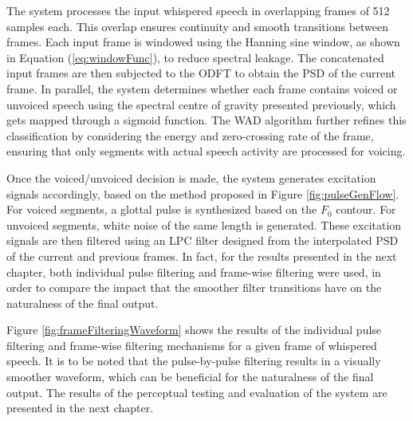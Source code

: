 The system processes the input whispered speech in overlapping frames of 512 samples each. This overlap ensures continuity and smooth transitions between frames. Each input frame is windowed using the Hanning sine window, as shown in Equation (\ref{eq:windowFunc}), to reduce spectral leakage. The concatenated input frames are then subjected to the ODFT to obtain the PSD of the current frame.  In parallel, the system determines whether each frame contains voiced or unvoiced speech using the spectral centre of gravity presented previously, which gets mapped through a sigmoid function. The WAD algorithm further refines this classification by considering the energy and zero-crossing rate of the frame, ensuring that only segments with actual speech activity are processed for voicing.

Once the voiced/unvoiced decision is made, the system generates excitation signals accordingly, based on the method proposed in Figure \ref{fig:pulseGenFlow}. For voiced segments, a glottal pulse is synthesized based on the $F_0$ contour. For unvoiced segments, white noise of the same length is generated.  These excitation signals are then filtered using an LPC filter designed from the interpolated PSD of the current and previous frames. In fact, for the results presented in the next chapter, both individual pulse filtering and frame-wise filtering were used, in order to compare the impact that the smoother filter transitions have on the naturalness of the final output. %

Figure \ref{fig:frameFilteringWaveform} shows the results of the individual pulse filtering and frame-wise filtering mechanisms for a given frame of whispered speech. It is to be noted that the pulse-by-pulse filtering results in a visually smoother waveform, which can be beneficial for the naturalness of the final output. The results of the perceptual testing and evaluation of the system are presented in the next chapter.

